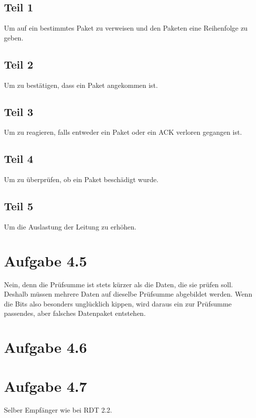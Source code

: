 \documentclass[10pt,a4paper]{article}
\begin{document}
\subsection{Teil 1}

Um auf ein bestimmtes Paket zu verweisen und den Paketen eine Reihenfolge zu
geben.

\subsection{Teil 2}

Um zu bestätigen, dass ein Paket angekommen ist.

\subsection{Teil 3}

Um zu reagieren, falls entweder ein Paket oder ein ACK verloren gegangen ist.

\subsection{Teil 4}

Um zu überprüfen, ob ein Paket beschädigt wurde.

\subsection{Teil 5}

Um die Auslastung der Leitung zu erhöhen.

\section{Aufgabe 4.5}

Nein, denn die Prüfsumme ist stets kürzer als die Daten, die sie prüfen
soll. Deshalb müssen mehrere Daten auf dieselbe Prüfsumme abgebildet
werden. Wenn die Bits also besonders unglücklich kippen, wird daraus ein zur
Prüfsumme passendes, aber falsches Datenpaket entstehen.

\section{Aufgabe 4.6}

\section{Aufgabe 4.7}

Selber Empfänger wie bei RDT 2.2.
\end{document}
